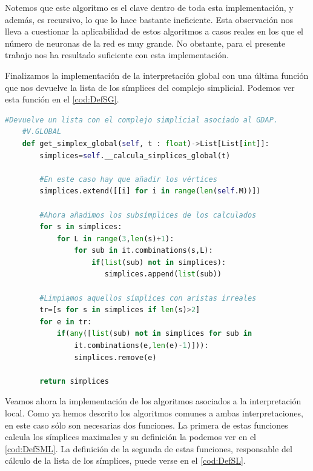 \documentclass[12pt, a4paper, twoside]{book}
\numberwithin{equation}{section}
\theoremstyle{definition}
\theoremstyle{remark}
\theoremstyle{plain}
\begin{document}
	Notemos que este algoritmo es el clave dentro de toda esta 
	implementación, y además, es recursivo, lo que lo hace bastante 
	ineficiente. Esta observación nos lleva a 
	cuestionar la aplicabilidad de estos algoritmos a casos reales en los 
	que el número de neuronas de la red es muy grande. No obstante, para 
	el presente trabajo nos ha resultado suficiente con esta 
	implementación.

	Finalizamos la implementación de la interpretación global con una 
	última función que nos devuelve la lista de los símplices del complejo
	simplicial. Podemos ver esta función en el \autoref{cod:DefSG}.

	\begin{lstlisting}[language=Python, float=htbp, caption= Función para 
	el cálculo de todos los símplices (global)., label=cod:DefSG]
	#Devuelve un lista con el complejo simplicial asociado al GDAP. 
	#V.GLOBAL
	def get_simplex_global(self, t : float)->List[List[int]]:
        simplices=self.__calcula_simplices_global(t)
        
        #En este caso hay que añadir los vértices
        simplices.extend([[i] for i in range(len(self.M))])
        
        #Ahora añadimos los subsímplices de los calculados
        for s in simplices:
            for L in range(3,len(s)+1):
                for sub in it.combinations(s,L):
                    if(list(sub) not in simplices):
                       simplices.append(list(sub))
        
        #Limpiamos aquellos símplices con aristas irreales
        tr=[s for s in simplices if len(s)>2]
        for e in tr:
            if(any([list(sub) not in simplices for sub in 
                it.combinations(e,len(e)-1)])):
                simplices.remove(e)

        return simplices
	\end{lstlisting}

	Veamos ahora la implementación de los algoritmos asociados a la 
	interpretación local. Como ya hemos descrito los algoritmos comunes a 
	ambas interpretaciones, en este caso sólo son necesarias dos 
	funciones. La primera de estas funciones calcula los símplices 
	maximales y su definición la podemos ver en el \autoref{cod:DefSML}. 
	La 
	definición de la segunda de estas funciones, responsable del cálculo 
	de la lista de los símplices, puede verse en el \autoref{cod:DefSL}.
\end{document}
